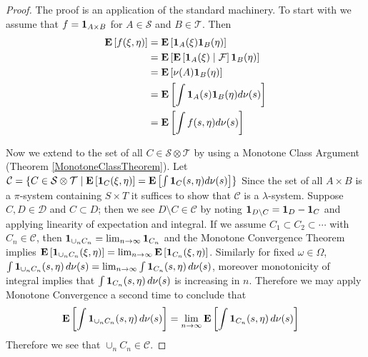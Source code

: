 \begin{proof}
The proof is an application of the standard machinery.
To start with we assume that $f = \characteristic{A \times B}$ for $A
\in \mathcal{S}$ and $B \in \mathcal{T}$.  
Then 
\begin{align*}
\expectation{f(\xi, \eta)}  &= 
\expectation{\characteristic{A}(\xi) \characteristic{B}(\eta)} \\
&= \expectation{\cexpectationlong{\mathcal{F}}{\characteristic{A}(\xi)} \characteristic{B}(\eta) } \\
&= \expectation{\nu(A) \characteristic{B}(\eta)} \\
&= \expectation{\int \characteristic{A}(s) \characteristic{B}(\eta)
  d\nu(s) } \\
&= \expectation{\int f(s, \eta)  d\nu(s) } \\
\end{align*}

Now we extend to the set of all $C \in \mathcal{S}\otimes
\mathcal{T}$ by using a Monotone Class Argument (Theorem
\ref{MonotoneClassTheorem}).  Let $\mathcal{C} = \lbrace C \in \mathcal{S}\otimes
\mathcal{T} \mid \expectation{\characteristic{C}(\xi, \eta)} = \expectation{\int
  \characteristic{C}(s, \eta)  d\nu(s) } \rbrace$
Since the set of all $A \times B$ is a $\pi$-system
containing $S \times T$ it suffices to show that $\mathcal{C}$ is a $\lambda$-system.
Suppose $C, D \in \mathcal{D}$ and $C \subset D$; then we see $D
\setminus C \in \mathcal{C}$ by
noting $\characteristic{D \setminus C} = \characteristic{D} -
\characteristic{C}$ and applying linearity of expectation and
integral.  If we assume $C_1 \subset C_2 \subset \cdots$ with $C_n \in
\mathcal{C}$, then
$\characteristic{\cup_n C_n} = \lim_{n \to \infty}
\characteristic{C_n}$ and the Monotone Convergence Theorem implies
$\expectation{\characteristic{\cup_n C_n}(\xi, \eta)} = \lim_{n \to
  \infty}\expectation{\characteristic{C_n}(\xi, \eta)}$.  Similarly
for fixed $\omega \in \Omega$, $\int \characteristic{\cup_n C_n}(s,
\eta) \, d\nu(s) = \lim_{n \to \infty} \int \characteristic{C_n}(s,
\eta) \, d\nu(s)$, moreover monotonicity of integral implies that $\int \characteristic{C_n}(s,
\eta) \, d\nu(s)$
is increasing in $n$.  Therefore we may apply Monotone Convergence a
second time to conclude that
\begin{align*}
\expectation{\int \characteristic{\cup_n C_n}(s,\eta) \, d\nu(s) } &=
\lim_{n\to \infty}\expectation{\int \characteristic{C_n}(s,\eta) \, d\nu(s) } 
\end{align*}
Therefore we see that $\cup_n C_n \in
\mathcal{C}$.  


\end{proof}

